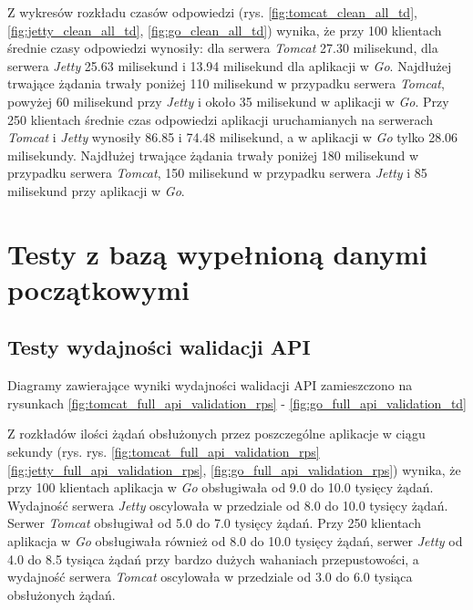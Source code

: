 Z wykresów rozkładu czasów odpowiedzi (rys. \ref{fig:tomcat_clean_all_td}, \ref{fig:jetty_clean_all_td}, \ref{fig:go_clean_all_td}) wynika, że przy 100 klientach średnie czasy odpowiedzi wynosiły: dla serwera \textsl{Tomcat} 27.30  milisekund, dla serwera \textsl{Jetty} 25.63 milisekund i 13.94 milisekund dla aplikacji w \textsl{Go}.  Najdłużej trwające żądania trwały poniżej 110 milisekund w przypadku serwera \textsl{Tomcat}, powyżej 60 milisekund przy \textsl{Jetty} i około 35 milisekund  w aplikacji w \textsl{Go}. Przy 250 klientach średnie czas odpowiedzi aplikacji uruchamianych na serwerach \textsl{Tomcat} i \textsl{Jetty} wynosiły 86.85 i 74.48 milisekund, a w aplikacji w \textsl{Go} tylko 28.06 milisekundy. Najdłużej trwające żądania trwały poniżej 180 milisekund w przypadku serwera \textsl{Tomcat}, 150 milisekund w przypadku serwera \textsl{Jetty} i 85 milisekund przy aplikacji w \textsl{Go}.

% 
\clearpage

\newpage
\section{Testy z bazą wypełnioną danymi początkowymi}
\subsection{Testy wydajności walidacji API}
Diagramy zawierające wyniki wydajności walidacji API zamieszczono na rysunkach \ref{fig:tomcat_full_api_validation_rps} - \ref{fig:go_full_api_validation_td}

Z rozkładów ilości żądań obsłużonych przez poszczególne aplikacje w ciągu sekundy (rys. rys. \ref{fig:tomcat_full_api_validation_rps} \ref{fig:jetty_full_api_validation_rps}, \ref{fig:go_full_api_validation_rps}) wynika, że przy 100 klientach aplikacja  w \textsl{Go} obsługiwała od 9.0 do 10.0 tysięcy żądań. Wydajność serwera  \textsl{Jetty} oscylowała w przedziale od 8.0 do 10.0 tysięcy żądań. Serwer \textsl{Tomcat} obsługiwał od 5.0 do 7.0 tysięcy żądań. Przy 250 klientach aplikacja w \textsl{Go} obsługiwała również od 8.0 do 10.0 tysięcy żądań, serwer \textsl{Jetty} od 4.0 do 8.5 tysiąca żądań przy bardzo dużych wahaniach przepustowości, a wydajność serwera \textsl{Tomcat} oscylowała w przedziale od 3.0 do 6.0 tysiąca obsłużonych żądań. 
 
